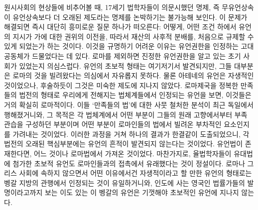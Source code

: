 원시사회의 현상들에 비추어볼 때,
17세기 법학자들이 의문시했던 명제, 즉
무유언상속이 유언상속보다 더 오래된 제도라는 명제를
논박하기는 불가능해 보인다.
이 문제가 해결되면 즉시 대단히 흥미로운 질문 하나가 떠오른다:
어떻게, 어떤 조건 하에서
유언의 지시가
가에 대한 권위의 이전을,
따라서 재산의 사후적 분배를,
처음으로 규제할 수 있게 되었는가 하는 것이다.
이것을 규명하기 어려운 이유는
유언권한을 인정하는 고대 공동체가 드물었다는 데 있다.
로마를 제외하면 진정한 유언권한을 알고 있는 초기 사회가 있었는지 의심스럽다.
유언의 초보적 형태는 여기저기서 발견되지만,
그들 대부분은 로마의 것을 빌려왔다는 의심에서 자유롭지 못하다.
물론 아테네의 유언은 자생적인 것이었으나,
후술하듯이 그것은 미숙한 제도에 지나지 않았다.
로마제국을 정복한 만족들의 법전의 형태로 우리에게 전해지는
법체계들에서 인정되는 유언을 보면, 이것들은 거의 확실히 로마적이다.
이들 `만족들의 법'에 대한
사뭇 철처한 분석이 최근 독일에서 행해졌거니와,
그 목적은 각 법체계에서 어떤 부분이
그들의 원래 고향에서부터 부족 관습을 구성하던 부분이며
어떤 부분이 로마인들의 법에서 빌려온 부차적인 요소인지를
가려내는 것이었다.
이러한 과정을 거쳐 하나의 결과가 한결같이 도출되었으니,
각 법전의 오래된 핵심부분에는 유언의 흔적이 발견되지 않는다는 것이었다.
유언법이 존재한다면, 어느 것이나 로마법에서 가져온 것이었다.
마찬가지로,  율법학자들이 유대법에 첨가한
초보적 유언도 로마인들과의 접촉에서 유래했다는 것이 정설이다.
로마나 그리스 사회에 속하지 않으면서
어떤 이유에서건 자생적이라고 할 만한 유언의 형태로는
벵갈 지방의 관행에서 인정되는 것이 유일하거니와,
인도에 사는 영국인 법률가들의 발명이라고까지 보는 이도 있는
이 벵갈의 유언은
기껏해야 초보적인 유언에 지나지 않는다.

